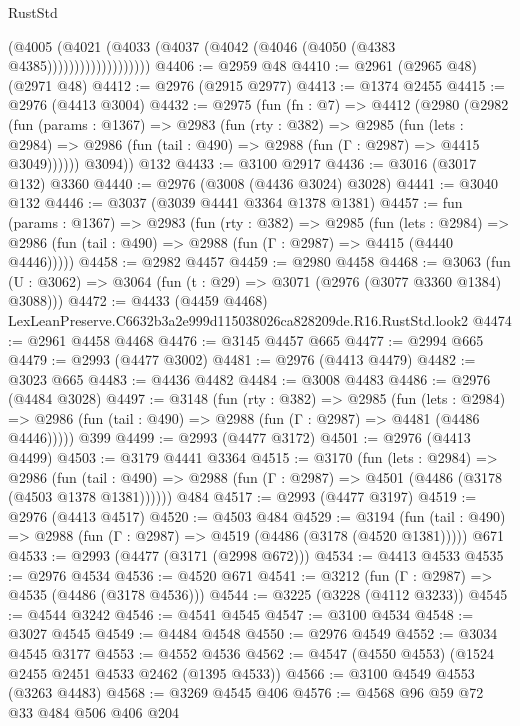 \begin{lexlean}{RustStd}
\begin{coremodule}
                          (@4005
                            (@4021
                              (@4033 (@4037 (@4042 (@4046 (@4050 (@4383 @4385)))))))))))))))))))
@4406 := @2959 @48
@4410 := @2961 (@2965 @48) (@2971 @48)
@4412 := @2976 (@2915 @2977)
@4413 := @1374 @2455
@4415 := @2976 (@4413 @3004)
@4432 := @2975
    (fun (fn : @7) =>
    @4412
      (@2980
        (@2982
          (fun (params : @1367) =>
          @2983
            (fun (rty : @382) =>
            @2985
              (fun (lets : @2984) =>
              @2986 (fun (tail : @490) => @2988 (fun (Γ : @2987) => @4415 @3049))))))
        @3094))
    @132
@4433 := @3100 @2917
@4436 := @3016 (@3017 @132) @3360
@4440 := @2976 (@3008 (@4436 @3024) @3028)
@4441 := @3040 @132
@4446 := @3037 (@3039 @4441 @3364 @1378 @1381)
@4457 := fun (params : @1367) =>
  @2983
    (fun (rty : @382) =>
    @2985
      (fun (lets : @2984) =>
      @2986 (fun (tail : @490) => @2988 (fun (Γ : @2987) => @4415 (@4440 @4446)))))
@4458 := @2982 @4457
@4459 := @2980 @4458
@4468 := @3063 (fun (U : @3062) => @3064 (fun (t : @29) => @3071 (@2976 (@3077 @3360 @1384) @3088)))
@4472 := @4433 (@4459 @4468) LexLeanPreserve.C6632b3a2e999d115038026ca828209de.R16.RustStd.look2
@4474 := @2961 @4458 @4468
@4476 := @3145 @4457 @665
@4477 := @2994 @665
@4479 := @2993 (@4477 @3002)
@4481 := @2976 (@4413 @4479)
@4482 := @3023 @665
@4483 := @4436 @4482
@4484 := @3008 @4483
@4486 := @2976 (@4484 @3028)
@4497 := @3148
    (fun (rty : @382) =>
    @2985
      (fun (lets : @2984) =>
      @2986 (fun (tail : @490) => @2988 (fun (Γ : @2987) => @4481 (@4486 @4446)))))
    @399
@4499 := @2993 (@4477 @3172)
@4501 := @2976 (@4413 @4499)
@4503 := @3179 @4441 @3364
@4515 := @3170
    (fun (lets : @2984) =>
    @2986
      (fun (tail : @490) => @2988 (fun (Γ : @2987) => @4501 (@4486 (@3178 (@4503 @1378 @1381))))))
    @484
@4517 := @2993 (@4477 @3197)
@4519 := @2976 (@4413 @4517)
@4520 := @4503 @484
@4529 := @3194
    (fun (tail : @490) => @2988 (fun (Γ : @2987) => @4519 (@4486 (@3178 (@4520 @1381)))))
    @671
@4533 := @2993 (@4477 (@3171 (@2998 @672)))
@4534 := @4413 @4533
@4535 := @2976 @4534
@4536 := @4520 @671
@4541 := @3212 (fun (Γ : @2987) => @4535 (@4486 (@3178 @4536)))
@4544 := @3225 (@3228 (@4112 @3233))
@4545 := @4544 @3242
@4546 := @4541 @4545
@4547 := @3100 @4534
@4548 := @3027 @4545
@4549 := @4484 @4548
@4550 := @2976 @4549
@4552 := @3034 @4545 @3177
@4553 := @4552 @4536
@4562 := @4547 (@4550 @4553) (@1524 @2455 @2451 @4533 @2462 (@1395 @4533))
@4566 := @3100 @4549 @4553 (@3263 @4483)
@4568 := @3269 @4545 @406
@4576 := @4568 @96 @59 @72 @33 @484 @506 @406 @204

\end{coremodule}
\end{lexlean}
